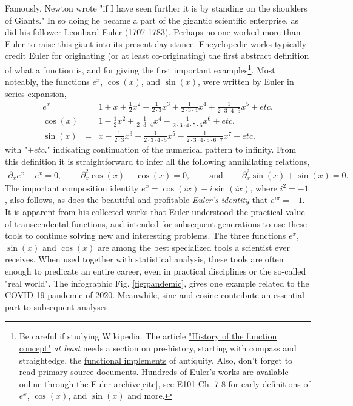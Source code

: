 \documentclass[nofootinbib,preprint]{revtex4-1}
\begin{document}
Famously, Newton wrote "if I have seen further it is by standing on the shoulders of Giants." 
In so doing he became a part of the gigantic scientific enterprise, as did his follower 
Leonhard Euler (1707-1783). Perhaps no one worked more than Euler to raise this 
giant into its present-day stance. Encyclopedic works typically credit Euler for originating 
(or at least co-originating) the first abstract definition of what a function 
is, and for giving the first important examples\footnote{Be careful if studying Wikipedia. 
The article \href{https://en.wikipedia.org/wiki/History_of_the_function_concept}{"History 
of the function concept"} \textit{at least} needs a section on pre-history, starting with 
compass and straightedge, the \underline{functional implements} of antiquity. Also,
don't forget to read primary source documents. Hundreds of Euler's works are available online
through the Euler archive[cite], see \href{http://eulerarchive.maa.org/pages/E101.html}{E101}
Ch. 7-8 for early definitions of $e^x$, $\cos(x)$, and $\sin(x)$ and more. }.
Most noteably, the functions $e^x$, $\cos(x)$, and $\sin(x)$, were written by 
Euler in series expansion, 
\begin{eqnarray}
e^x &=& 1+x+\frac{1}{2}x^2+\frac{1}{2\cdot 3}x^3  +\frac{1}{2\cdot 3 \cdot 4}x^4  +\frac{1}{2\cdot 3\cdot 4\cdot 5}x^5  + etc.     \nonumber \\
\cos(x) &=& 1-\frac{1}{2}x^2 +\frac{1}{2\cdot 3\cdot 4}x^4 - \frac{1}{2\cdot 3\cdot 4\cdot 5\cdot 6}x^6 + etc.  \nonumber \\ 
\sin(x) &=& x-\frac{1}{2\cdot 3}x^3 +\frac{1}{2\cdot 3\cdot 4\cdot 5}x^5  - \frac{1}{2\cdot 3\cdot 4\cdot 5\cdot 6\cdot 7}x^7 + etc.     \nonumber 
\end{eqnarray}
with "$+ etc.$" indicating continuation of the numerical pattern to infinity. From this 
definition it is straightforward to infer all the following annihilating relations,
\begin{eqnarray}
\partial_x e^x - e^x = 0, \;\;\;\;\;\;\;\; \partial_x^2 \cos(x) + \cos(x) = 0, 
\;\;\;\;\;\;\;\; \text{and} \;\;\;\;\;\;\;\; \partial_x^2 \sin(x) + \sin(x) = 0. \nonumber
\end{eqnarray}
The important composition identity $e^x = \cos(i x) - i \sin(i x)$, where $i^2=-1$, 
also follows, as does the beautiful and profitable \textit{Euler's identity} that $e^{i\pi}=-1$.
It is apparent from his collected works that Euler understood the practical value of 
transcendental functions, and intended for subsequent generations to use these tools 
to continue solving new and interesting problems. The three functions $e^x$, $\sin(x)$ 
and $\cos(x)$ are among the best specialized tools a scientist ever receives. When 
used together with statistical analysis, these tools are often enough to predicate 
an entire career, even in practical disciplines or the so-called "real world". The 
infographic Fig. \ref{fig:pandemic}, gives one example related to the COVID-19 
pandemic of 2020. Meanwhile, sine and cosine contribute an essential part 
to subsequent analyses. 
\end{document}
